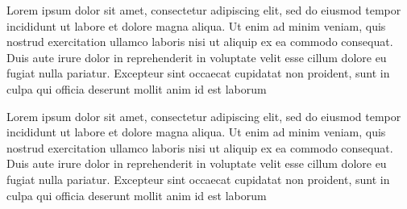 \documentclass{article}
\begin{document}
\begin{pages}
\begin{Leftside}
\beginnumbering
\pstart
Lorem ipsum dolor sit amet, consectetur adipiscing elit, sed do eiusmod tempor incididunt ut labore et dolore magna aliqua. Ut enim ad minim veniam, quis nostrud exercitation ullamco laboris nisi ut aliquip ex ea commodo consequat. Duis aute irure dolor in reprehenderit in voluptate velit esse cillum dolore eu fugiat nulla pariatur. Excepteur sint occaecat cupidatat non proident, sunt in culpa qui officia deserunt mollit anim id est laborum
\pend
\endnumbering
\end{Leftside}

\begin{Rightside}
\beginnumbering
\pstart
Lorem ipsum dolor sit amet, consectetur adipiscing elit, sed do eiusmod tempor incididunt ut labore et dolore magna aliqua. Ut enim ad minim veniam, quis nostrud exercitation ullamco laboris nisi ut aliquip ex ea commodo consequat. Duis aute irure dolor in reprehenderit in voluptate velit esse cillum dolore eu fugiat nulla pariatur. Excepteur sint occaecat cupidatat non proident, sunt in culpa qui officia deserunt mollit anim id est laborum
\pend
\endnumbering
\end{Rightside}
\end{pages}
\Pages
\end{document}
